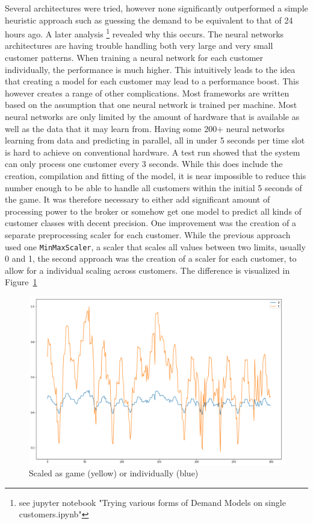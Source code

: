Several architectures were tried, however none significantly outperformed a simple heuristic approach such as guessing
the demand to be equivalent to that of 24 hours ago. A later analysis
\footnote{see jupyter notebook "Trying various forms of Demand Models on single customers.ipynb"}
revealed why this occurs. The neural networks architectures are having trouble handling both very large and very small
customer patterns. When training a neural network for each customer individually, the performance is much higher. This
intuitively leads to the idea that creating a model for each customer may lead to a performance boost. This however
creates a range of other complications. Most frameworks are written based on the assumption that one neural network is
trained per machine. Most neural networks are only limited by the amount of hardware that is available as well as the
data that it may learn from. Having some 200+ neural networks learning from data and predicting in parallel, all in
under 5 seconds per time slot is hard to achieve on conventional hardware. A test run showed that the system can only
process one customer every 3 seconds. While this does include the creation, compilation and fitting of the model, it is
near impossible to reduce
this number enough to be able to handle all customers within the initial 5 seconds of the game. It was therefore
necessary to either add significant amount of processing power to the broker or somehow get one model to predict all
kinds of customer classes with decent precision. One improvement was the creation of a separate preprocessing scaler for
each customer. While the previous approach used one \texttt{MinMaxScaler}, a scaler that scales all values between two
limits, usually 0 and 1, the second approach was the creation of a scaler for each customer, to allow for a individual
scaling across customers. The difference is visualized in Figure~\ref{fig:imgfrosty}

\begin{figure}[]
    \centering
    \includegraphics[width=0.8\linewidth]{img/frosty_scaled.png}
    \caption{Scaled as game (yellow)  or individually (blue)}
    \label{fig:imgfrosty}
\end{figure}

